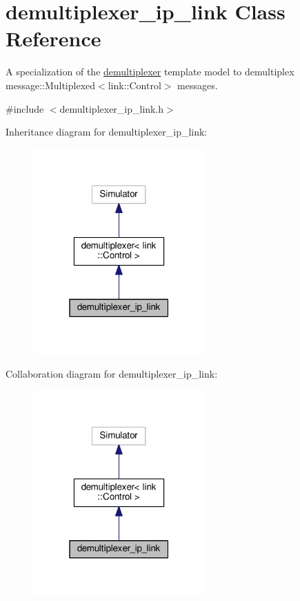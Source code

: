 \hypertarget{classdemultiplexer__ip__link}{}\section{demultiplexer\+\_\+ip\+\_\+link Class Reference}
\label{classdemultiplexer__ip__link}


A specialization of the \hyperlink{classdemultiplexer}{demultiplexer} template model to demultiplex message\+::\+Multiplexed$<$link\+::\+Control$>$ messages.  




{\ttfamily \#include $<$demultiplexer\+\_\+ip\+\_\+link.\+h$>$}



Inheritance diagram for demultiplexer\+\_\+ip\+\_\+link\+:\nopagebreak
\begin{figure}[H]
\begin{center}
\leavevmode
\includegraphics[width=187pt]{classdemultiplexer__ip__link__inherit__graph}
\end{center}
\end{figure}


Collaboration diagram for demultiplexer\+\_\+ip\+\_\+link\+:\nopagebreak
\begin{figure}[H]
\begin{center}
\leavevmode
\includegraphics[width=187pt]{classdemultiplexer__ip__link__coll__graph}
\end{center}
\end{figure}
